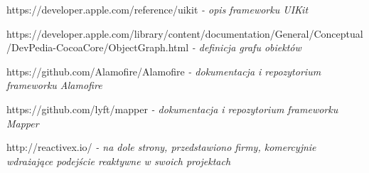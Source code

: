 \documentclass[12pt,oneside,a4paper]{report}
\begin{document}
\begin{thebibliography}{50}
https://developer.apple.com/reference/uikit
\emph{ - opis frameworku UIKit}

 https://developer.apple.com/library/content/documentation/General/Conceptual/DevPedia-CocoaCore/ObjectGraph.html
\emph{ - definicja grafu obiektów}

https://github.com/Alamofire/Alamofire
\emph{ - dokumentacja i repozytorium frameworku Alamofire}

https://github.com/lyft/mapper
\emph{ - dokumentacja i repozytorium frameworku Mapper}

http://reactivex.io/
\emph{ - na dole strony, przedstawiono firmy, komercyjnie wdrażające podejście reaktywne w swoich projektach}
\end{thebibliography}
\end{document}
